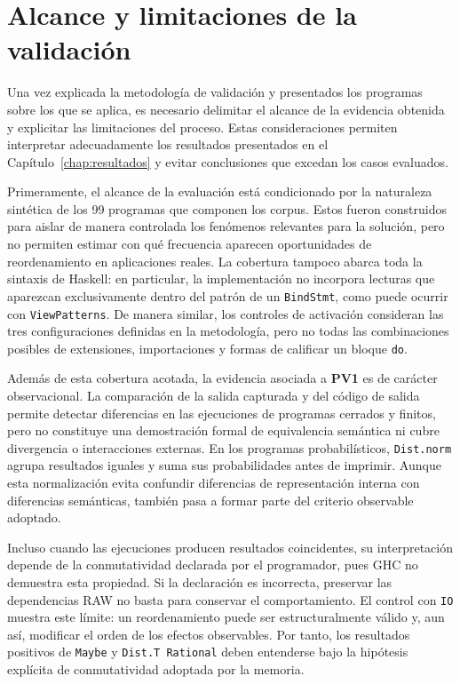 
\section{Alcance y limitaciones de la validación}
\label{sec:validacion-alcance}

Una vez explicada la metodología de validación y presentados los programas sobre los que se aplica, es necesario delimitar el alcance de la evidencia obtenida y explicitar las limitaciones del proceso. Estas consideraciones permiten interpretar adecuadamente los resultados presentados en el Capítulo~\ref{chap:resultados} y evitar conclusiones que excedan los casos evaluados.

Primeramente, el alcance de la evaluación está condicionado por la naturaleza sintética de los 99 programas que componen los corpus. Estos fueron construidos para aislar de manera controlada los fenómenos relevantes para la solución, pero no permiten estimar con qué frecuencia aparecen oportunidades de reordenamiento en aplicaciones reales. La cobertura tampoco abarca toda la sintaxis de \textsf{Haskell}: en particular, la implementación no incorpora lecturas que aparezcan exclusivamente dentro del patrón de un \texttt{BindStmt}, como puede ocurrir con \texttt{ViewPatterns}. De manera similar, los controles de activación consideran las tres configuraciones definidas en la metodología, pero no todas las combinaciones posibles de extensiones, importaciones y formas de calificar un bloque \texttt{do}.

Además de esta cobertura acotada, la evidencia asociada a \textbf{PV1} es de carácter observacional. La comparación de la salida capturada y del código de salida permite detectar diferencias en las ejecuciones de programas cerrados y finitos, pero no constituye una demostración formal de equivalencia semántica ni cubre divergencia o interacciones externas. En los programas probabilísticos, \texttt{Dist.norm} agrupa resultados iguales y suma sus probabilidades antes de imprimir. Aunque esta normalización evita confundir diferencias de representación interna con diferencias semánticas, también pasa a formar parte del criterio observable adoptado.

Incluso cuando las ejecuciones producen resultados coincidentes, su interpretación depende de la conmutatividad declarada por el programador, pues \textsf{GHC} no demuestra esta propiedad. Si la declaración es incorrecta, preservar las dependencias RAW no basta para conservar el comportamiento. El control con \texttt{IO} muestra este límite: un reordenamiento puede ser estructuralmente válido y, aun así, modificar el orden de los efectos observables. Por tanto, los resultados positivos de \texttt{Maybe} y \texttt{Dist.T Rational} deben entenderse bajo la hipótesis explícita de conmutatividad adoptada por la memoria.

